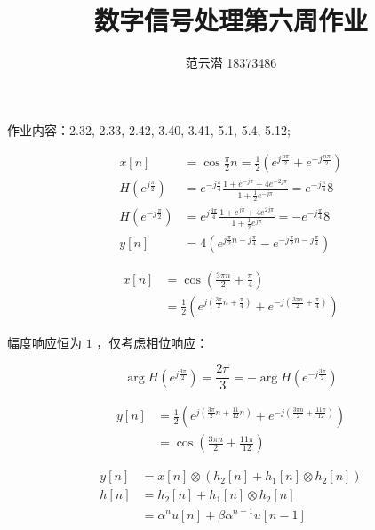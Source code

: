 \documentclass[lang=cn,11pt,a4paper,cite=authoryear,twocolumn]{elegantpaper}
\title{数字信号处理\quad 第六周作业}
\author{范云潜 18373486}
\institute{微电子学院 184111 班}
\date{\zhtoday}
\begin{document}
\maketitle

作业内容：2.32,
2.33,
2.42,
3.40,
3.41,
5.1,
5.4, 
5.12;


\[\begin{aligned}
    x[n] &= \cos \frac{\pi}{2} n = \frac{1}{2}(e^{j \frac{n \pi}{2}} + e^{-j \frac{n \pi}{2}}) \\
    H(e^{j\frac{\pi}{2}}) &= e^{-j\frac{\pi}{4}} \frac{1+e^{-j\pi}+4e^{-2j\pi}}{1+\frac{1}{2}e^{-j\pi}} = e^{-j\frac{\pi}{4}} 8 \\ 
    H(e^{-j\frac{\pi}{2}}) &= e^{j\frac{3\pi}{4}} \frac{1+e^{j\pi}+4e^{2j\pi}}{1+\frac{1}{2}e^{j\pi}} = - e^{-j\frac{\pi}{4}} 8 \\ 
    y[n] &= 4 (e^{j\frac{\pi}{2} n - j \frac{\pi}{4}} - e^{-j \frac{\pi}{2}n - j \frac{\pi}{4}}) 
\end{aligned}\]


\[\begin{aligned}
    x[n] &= \cos (\frac{3\pi n}{2} + \frac{\pi}{4}) \\
    & = \frac{1}{2}(e^{j(\frac{3\pi}{2}n + \frac{\pi}{4})} + e^{-j(\frac{3 \pi n}{2} + \frac{\pi}{4})})
\end{aligned}\]

幅度响应恒为 \(1\) ，仅考虑相位响应：

\[\arg H(e^{j \frac{3\pi}{2}}) = \frac{2 \pi}{3} = - \arg H(e^{-j \frac{3\pi}{2}})\] 

\[\begin{aligned}
    y[n] &= \frac{1}{2}(e^{j(\frac{3\pi}{2}n + \frac{11}{12}n)} + e^{-j(\frac{3 \pi n }{2} + \frac{11 \pi }{12})})\\
     &=\cos (\frac{3\pi n }{2} + \frac{11 \pi}{12})
\end{aligned}\]




\[\begin{aligned}
    y[n] &= x[n] \otimes (h_2[n] + h_1[n] \otimes h_2[n])\\
    h[n] &= h_2[n] + h_1[n] \otimes h_2[n] \\ 
    &= \alpha ^n u[n] + \beta \alpha^{n-1} u[n-1]
\end{aligned}\] 

\end{document}
